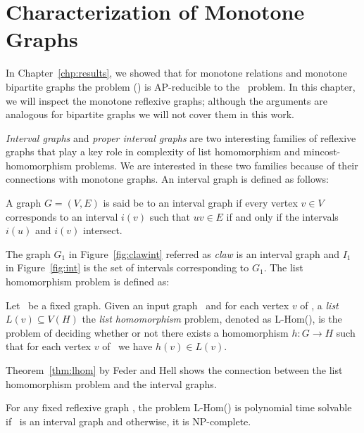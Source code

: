\chapter{Characterization of Monotone Graphs}
In Chapter~\ref{chp:results}, we showed that for monotone relations and monotone
bipartite graphs the problem \ccsp(\mH) is AP-reducible to the \cbis\ problem. In this chapter,
we will inspect the monotone reflexive graphs; although the arguments are
analogous for bipartite graphs we will not cover them in this work.

\emph{Interval graphs} and \emph{proper interval graphs}
are two interesting families of reflexive graphs that play a key role in complexity of 
list homomorphism and mincost-homomorphism problems. We are interested in these two families
because of their connections with monotone graphs. An interval graph is defined as follows:

\begin{defi}
A graph \(G=(V,E)\) is said be to an interval graph if every vertex \(v \in V\)
corresponds to an interval \(i(v)\) such that \(uv \in E\) if and only if the intervals
\(i(u)\) and \(i(v)\) intersect.
\end{defi}

\begin{figure} [h]
\hfill
\subfigure[\ensuremath{G_1}]{\label{fig:clawint}}\hfill 
\subfigure[\ensuremath{I_1}]{\label{fig:int}}\hfill 
\end{figure}

The graph \(G_1\) in Figure~\ref{fig:clawint} referred as \emph{claw} is an interval graph
and \(I_1\) in Figure~\ref{fig:int} is the set of intervals corresponding to \(G_1\)\@.
The list homomorphism problem is defined as:

\begin{defi} [L-Hom]
Let \mH\ be a fixed graph. Given an input graph \mG\ and for each vertex \(v\) of \mG,
a \emph{list} \(L(v) \subseteq V(H)\) the \emph{list homomorphism} problem, denoted
as L-Hom(\mH), is the problem of  deciding whether or not
there exists a homomorphism \(h: G\to H\) such that for each vertex \(v\) of \mG\ 
we have \(h(v)\in L(v)\)\@.
\end{defi}

Theorem~\ref{thm:lhom} by Feder and Hell shows the connection between the list homomorphism
problem and the interval graphs.

\begin{theorem} [Feder and Hell 1996 \cite{listhom}] \label{thm:lhom}
For any fixed reflexive graph \mH, the problem L-Hom(\mH) is polynomial time solvable if
\mH\ is an interval graph and otherwise, it is NP-complete.
\end{theorem}


